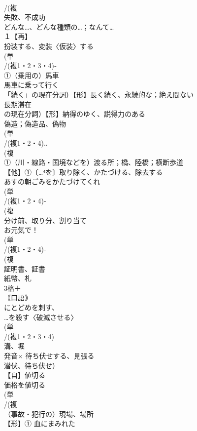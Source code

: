\documentclass[8pt]{extreport}
\begin{document}
\begin{CJK}{UTF8}{min}
\\	/(複
\\	失敗、不成功 
\\	どんな…、どんな種類の…；なんて…
\\	１【再】
\\	扮装する、変装〈仮装〉する
\\	(単
\\	/(複1・2・3・4)‐
\\	①（乗用の）馬車 
\\	馬車に乗って行く
\\	「続く」の現在分詞）【形】長く続く、永続的な；絶え間ない 
\\	長期滞在
\\	の現在分詞）【形】納得のゆく、説得力のある 
\\	偽造；偽造品、偽物 
\\	(単
\\	/(複1・2・4)..
\\	(複
\\	①（川・線路・国境などを）渡る所；橋、陸橋；横断歩道 
\\	【他】①〔…⁴を〕取り除く、かたづける、除去する 
\\	あすの朝ごみをかたづけてくれ 
\\	(単
\\	/(複1・2・4)-
\\	(複
\\	分け前、取り分、割り当て 
\\	お元気で！
\\	(単
\\	/(複1・2・4)-
\\	(複
\\	証明書、証書　
\\	紙幣、札 
\\	3格＋
\\	｟口語｠ 
\\	にとどめを刺す、
\\	…を殺す〈破滅させる〉
\\	(単
\\	/(複1・2・3・4)
\\	溝、堀 
\\	発音×	待ち伏せする、見張る　
\\	潜伏、待ち伏せ）
\\	【自】値切る 
\\	価格を値切る
\\	(単
\\	/(複
\\	（事故・犯行の）現場、場所 
\\	【形】① 血にまみれた 

\end{CJK}
\end{document}
